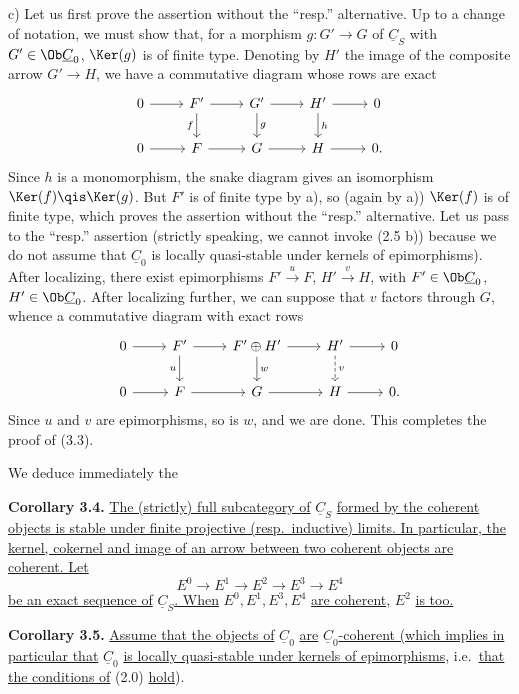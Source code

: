 c) Let us first prove the assertion without the ``resp.'' alternative. Up to a change of notation, we must show that, for a morphism \(g:G'\to G\) of \(\underline{C}_S\) with \(G'\in\Ob\underline{C}_0\), \(\Ker(g)\) is of finite type. Denoting by \(H'\) the image of the composite arrow \(G'\to H\), we have a commutative diagram whose rows are exact
\[
\begin{tikzcd}
0\arrow[r]&F'\arrow[r]\arrow[d,"f"']&G'\arrow[r]\arrow[d,"g"]&H'\arrow[r]\arrow[d,"h"]&0\\
0\arrow[r]&F\arrow[r]&G\arrow[r]&H\arrow[r]&0 .
\end{tikzcd}
\]
Since \(h\) is a monomorphism, the snake diagram gives an isomorphism \(\Ker(f)\qis\Ker(g)\). But \(F'\) is of finite type by a), so (again by a)) \(\Ker(f)\) is of finite type, which proves the assertion without the ``resp.'' alternative. Let us pass to the ``resp.'' assertion (strictly speaking, we cannot invoke (2.5 b)) because we do not assume that \(\underline{C}_0\) is locally quasi-stable under kernels of epimorphisms). After localizing, there exist epimorphisms \(F'\xrightarrow{u}F\), \(H'\xrightarrow{v}H\), with
%
\(F'\in\Ob\underline{C}_0\), \(H'\in\Ob\underline{C}_0\). After localizing further, we can suppose that \(v\) factors through \(G\), whence a commutative diagram with exact rows
\[
\begin{tikzcd}
0\arrow[r]&F'\arrow[r]\arrow[d,"u"']&F'\oplus H'\arrow[r]\arrow[d,"w"]&H'\arrow[r]\arrow[d,dashed,"v"]&0\\
0\arrow[r]&F\arrow[r]&G\arrow[r]&H\arrow[r]&0 .
\end{tikzcd}
\]
Since \(u\) and \(v\) are epimorphisms, so is \(w\), and we are done. This completes the proof of (3.3).

We deduce immediately the

\textbf{Corollary 3.4.} \uline{The (strictly) full subcategory of} \(\underline{C}_S\) \uline{formed by the coherent objects is stable under finite projective (resp.\ inductive) limits. In particular, the kernel, cokernel and image of an arrow between two coherent objects are coherent. Let}
\[
  E^0\longrightarrow E^1\longrightarrow E^2\longrightarrow E^3\longrightarrow E^4
\]
\uline{be an exact sequence of} \(\underline{C}_S\)\uline{. When} \(E^0,E^1,E^3,E^4\) \uline{are coherent,} \(E^2\) \uline{is too.}

\textbf{Corollary 3.5.} \uline{Assume that the objects of} \(\underline{C}_0\) \uline{are} \(\underline{C}_0\)\uline{-coherent (which implies in particular that} \(\underline{C}_0\) \uline{is locally quasi-stable under kernels of epimorphisms,} i.e.\ \uline{that the conditions of} (2.0) \uline{hold}).

